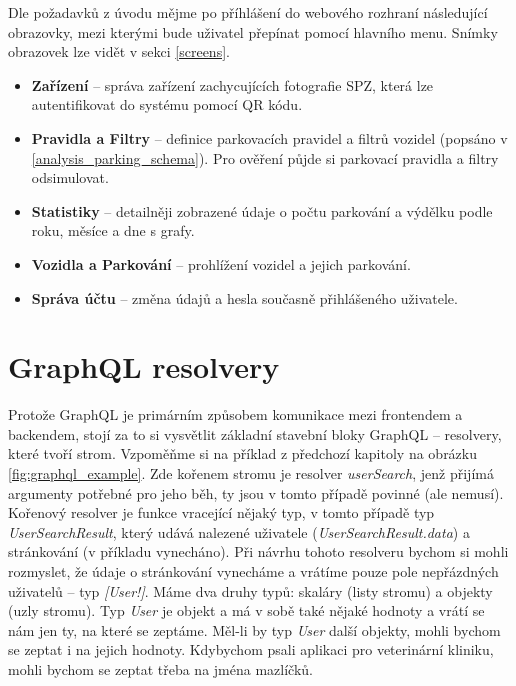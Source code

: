 Dle požadavků z úvodu mějme po příhlášení do webového rozhraní následující obrazovky,
mezi kterými bude uživatel přepínat pomocí hlavního menu.
Snímky obrazovek lze vidět v sekci \ref{screens}.

\begin{itemize}
  \setlength\itemsep{.05em}
  \item \textbf{Zařízení} -- správa zařízení zachycujících fotografie SPZ, která lze autentifikovat do systému pomocí
        QR kódu.
  \item \textbf{Pravidla a Filtry} -- definice parkovacích pravidel a filtrů vozidel (popsáno v \ref{analysis_parking_schema}).
        Pro ověření půjde si parkovací pravidla a filtry odsimulovat.
  \item \textbf{Statistiky} -- detailněji zobrazené údaje o počtu parkování a výdělku podle roku, měsíce a dne s grafy.
  \item \textbf{Vozidla a Parkování} -- prohlížení vozidel a jejich parkování.
  \item \textbf{Správa účtu} -- změna údajů a hesla současně přihlášeného uživatele.
\end{itemize}

\section{GraphQL resolvery}

Protože GraphQL je primárním způsobem komunikace mezi frontendem a backendem, stojí za to si vysvětlit základní stavební bloky
GraphQL -- resolvery, které tvoří strom. Vzpoměňme si na příklad z předchozí kapitoly na obrázku \ref{fig:graphql_example}.
Zde kořenem stromu je resolver \textit{userSearch}, jenž přijímá argumenty potřebné pro jeho běh, ty jsou v tomto případě
povinné (ale nemusí). Kořenový resolver je funkce vracející nějaký typ, v tomto případě typ \textit{UserSearchResult}, který udává nalezené
uživatele (\textit{UserSearchResult.data}) a stránkování (v příkladu vynecháno).
Při návrhu tohoto resolveru bychom si mohli rozmyslet, že údaje o stránkování vynecháme a vrátíme pouze
pole nepřázdných uživatelů -- typ \textit{[User!]}.
Máme dva druhy typů: skaláry (listy stromu) a objekty (uzly stromu).
Typ \textit{User} je objekt a má v sobě také nějaké hodnoty a vrátí se nám jen ty, na které se zeptáme. Měl-li by typ \textit{User}
další objekty, mohli bychom se zeptat i na jejich hodnoty. Kdybychom psali aplikaci pro veterinární kliniku, mohli bychom se zeptat
třeba na jména mazlíčků.

